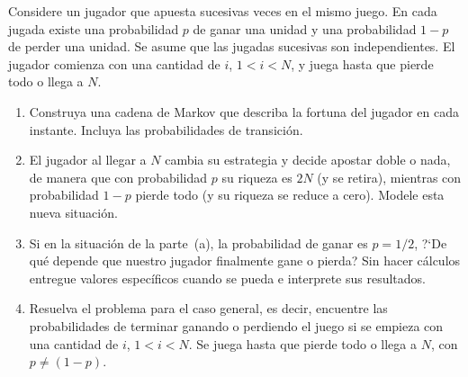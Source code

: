 \documentclass[10pt,a4paper]{article}
\newenvironment{enunciado}[1]{%
  \begin{tcolorbox}[
    breakable,
    colback=sectionbg!8, colframe=sectionbg,
    boxrule=0.8pt, arc=3pt, left=8pt, right=8pt, top=6pt, bottom=6pt,
    fonttitle=\normalsize\bfseries\sffamily, coltitle=white, colbacktitle=sectionbg, titlerule=0pt,
    title={#1},
  ]%
}{\end{tcolorbox}}
\begin{document}
\begin{enunciado}{P39 \textperiodcentered\ Juego de apuestas sucesivas}
  Considere un jugador que apuesta sucesivas veces en el mismo juego. En cada jugada
  existe una probabilidad $p$ de ganar una unidad y una probabilidad $1-p$ de perder
  una unidad. Se asume que las jugadas sucesivas son independientes. El jugador
  comienza con una cantidad de $i$, $1 < i < N$, y juega hasta que pierde todo o
  llega a $N$.

  \begin{enumerate}[label=\alph*)]
    \item Construya una cadena de Markov que describa la fortuna del jugador en cada
          instante. Incluya las probabilidades de transici\'on.
    \item El jugador al llegar a $N$ cambia su estrategia y decide apostar doble o
          nada, de manera que con probabilidad $p$ su riqueza es $2N$ (y se retira),
          mientras con probabilidad $1-p$ pierde todo (y su riqueza se reduce a cero).
          Modele esta nueva situaci\'on.
    \item Si en la situaci\'on de la parte~(a), la probabilidad de ganar es $p=1/2$,
          ?`De qu\'e depende que nuestro jugador finalmente gane o pierda? Sin hacer
          c\'alculos entregue valores espec\'ificos cuando se pueda e interprete sus
          resultados.
    \item Resuelva el problema para el caso general, es decir, encuentre las
          probabilidades de terminar ganando o perdiendo el juego si se empieza con
          una cantidad de $i$, $1 < i < N$. Se juega hasta que pierde todo o llega a
          $N$, con $p \ne (1-p)$.
  \end{enumerate}
\end{enunciado}
\end{document}
